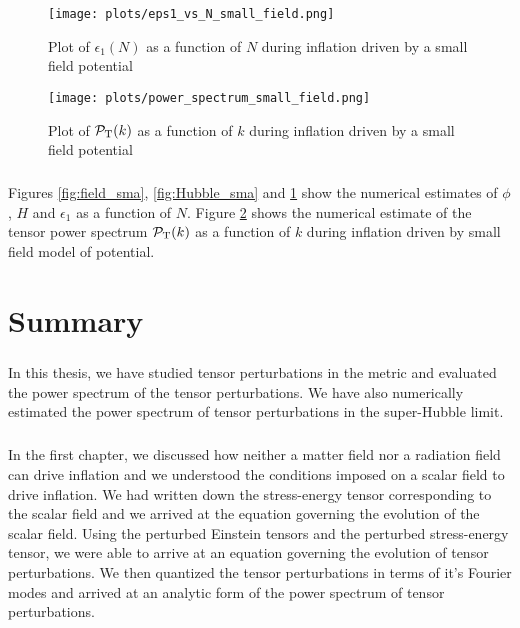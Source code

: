 \documentclass[12pt,a4paper,oneside]{book}
\begin{document}
\begin{figure}
\begin{center}
\texttt{[image: plots/eps1\_vs\_N\_small\_field.png]}
\caption[Plot of $\epsilon_1(N)$ as a function of $N$ during inflation driven by a small field potential ]{Plot of $\epsilon_1(N)$ as a function of $N$ during inflation driven by a small field potential }
\label{fig:epsilon_sma}
\end{center}
\end{figure}

\begin{figure}
\begin{center}
\texttt{[image: plots/power\_spectrum\_small\_field.png]}
\caption[Plot of $\mathcal{P}_{\rm T}(k)$ as a function of $k$ during inflation driven by a small field potential ]{Plot of $\mathcal{P}_{\rm T}(k)$ as a function of $k$ during inflation driven by a small field potential }
\label{fig:tps_sma}
\end{center}
\end{figure}

\paragraph*{} Figures \ref{fig:field_sma}, \ref{fig:Hubble_sma} and \ref{fig:epsilon_sma} show the numerical estimates of 
$\phi$, $H$ and $\epsilon_1$ as a function of $N$. Figure \ref{fig:tps_sma} shows the numerical estimate of 
the tensor power spectrum $\mathcal{P}_{\rm T}(k)$  as a function of $k$ during inflation driven by small field 
model of potential.


\chapter{Summary}

\paragraph*{} In this thesis, we have studied tensor perturbations 
in the metric and evaluated the power spectrum of the tensor perturbations. 
We have also numerically estimated the power spectrum of tensor perturbations 
in the super-Hubble limit.

\paragraph*{} In the first chapter, we discussed how neither a matter field nor a radiation field can drive 
inflation and we understood the conditions imposed on a scalar field to drive inflation. We had written down 
the stress-energy tensor corresponding to the scalar field and we arrived at the equation governing the 
evolution of the scalar field. Using the perturbed Einstein tensors and 
the perturbed stress-energy tensor, we were able to arrive at an equation governing the 
evolution of tensor perturbations. We then quantized the tensor perturbations in terms of it's Fourier modes 
and arrived at an analytic form of the power spectrum of tensor perturbations.
\end{document}
